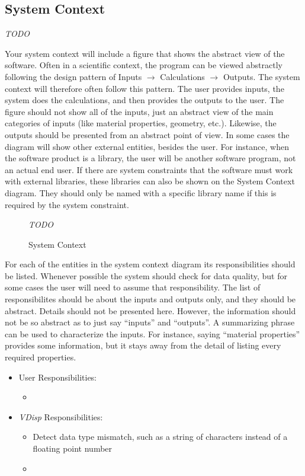 \documentclass[12pt]{article}
\begin{document}
\subsection{System Context}

\emph{TODO}

Your system context will include a figure that shows the abstract view of the
software.  Often in a scientific context, the program can be viewed abstractly
following the design pattern of Inputs $\rightarrow$ Calculations $\rightarrow$
Outputs.  The system context will therefore often follow this pattern.  The user
provides inputs, the system does the calculations, and then provides the outputs
to the user.  The figure should not show all of the inputs, just an abstract
view of the main categories of inputs (like material properties, geometry,
etc.).  Likewise, the outputs should be presented from an abstract point of
view.  In some cases the diagram will show other external entities, besides the
user.  For instance, when the software product is a library, the user will be
another software program, not an actual end user. If there are system
constraints that the software must work with external libraries, these libraries
can also be shown on the System Context diagram. They should only be named with
a specific library name if this is required by the system constraint.

\begin{figure}[h!]
\begin{center}
  \emph{TODO}
\caption{System Context}
\label{Fig_SystemContext} 
\end{center}
\end{figure}

For each of the entities in the system context diagram its responsibilities
should be listed.  Whenever possible the system should check for data quality,
but for some cases the user will need to assume that responsibility.  The list
of responsibilites should be about the inputs and outputs only, and they should
be abstract.  Details should not be presented here.  However, the information
should not be so abstract as to just say ``inputs'' and ``outputs''.  A
summarizing phrase can be used to characterize the inputs. For instance, saying
``material properties'' provides some information, but it stays away from the
detail of listing every required properties.

\begin{itemize}
\item User Responsibilities:
\begin{itemize}
\item 
\end{itemize}
\item \emph{VDisp}{} Responsibilities:
\begin{itemize}
\item Detect data type mismatch, such as a string of characters instead of a
  floating point number
\item 
\end{itemize}
\end{itemize}
\end{document}
